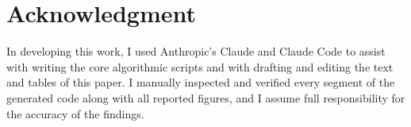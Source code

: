 \section*{Acknowledgment}

In developing this work, I used Anthropic's Claude and Claude Code to assist with writing the core algorithmic scripts and with drafting and editing the text and tables of this paper. I manually inspected and verified every segment of the generated code along with all reported figures, and I assume full responsibility for the accuracy of the findings.

